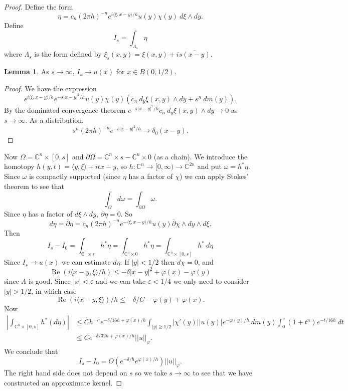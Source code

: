 \documentclass[12pt]{report}
\newcommand{\CC}{\mathbb{C}}
\newcommand{\dbar}{\overline\partial}
\renewcommand{\Re}{\operatorname{Re}}
\theoremstyle{definition}
\newtheorem{lemma}[theorem]{Lemma}
\begin{document}
\begin{proof}
    Define the form
    $$\eta = c_n(2\pi h)^{-n} e^{i\langle \xi, x - y\rangle/h} u(y)\chi(y) ~d\xi \wedge dy.$$
    Define $$I_s = \int_{\Lambda_s} \eta$$
    where $\Lambda_s$ is the form defined by $\xi_s(x, y) = \xi(x, y) + i\overline{s(x - y)}$.
\begin{lemma}
    As $s \to \infty$, $I_s \to u(x)$ for $x \in B(0, 1/2)$.
\end{lemma}
\begin{proof}
    We have the expression
    $$e^{i\langle\xi, x - y\rangle/h} e^{-s|x - y|^2/h} u(y) \chi(y)(c_n ~d_{\overline y} \xi(x, y) \wedge dy + s^n~dm(y)).$$
    By the dominated convergence theorem $e^{-s|x-y|^2/h}c_n~d_{\overline y}\xi(x, y) \wedge dy \to 0$ as $s \to \infty$. As a distribution,
    $$s^n(2\pi h)^{-n} e^{-s|x - y|^2/h} \to \delta_0(x - y).$$
\end{proof}
Now $\Omega = \CC^n \times [0, s]$ and $\partial \Omega = \CC^n \times s - \CC^n \times 0$ (as a chain). We introduce the homotopy $h(y, t) = \langle y, \xi\rangle + it\overline{x - y}$, so $h: \CC^n \to [0, \infty) \to \CC^{2n}$ and put $\omega = h^*\eta$. Since $\omega$ is compactly supported (since $\eta$ has a factor of $\chi$) we can apply Stokes' theorem to see that
    $$\int_\Omega d\omega = \int_{\partial \Omega} \omega.$$
    Since $\eta$ has a factor of $d\xi \wedge dy$, $\partial \eta = 0$. So
    $$d\eta = \dbar \eta = c_n(2\pi h)^{-n} e^{-\langle \xi, x-y\rangle/h} u(y) \dbar \chi \wedge dy \wedge d\xi.$$
    Then
$$
    I_s - I_0 = \int_{\CC^n \times s} h^*\eta = \int_{\CC^n \times 0} h^*\eta = \int_{\CC^n \times [0, s]} h^*~d\eta
$$
    Since $I_s \to u(x)$ we can estimate $d\eta$. If $|y| < 1/2$ then $d\chi = 0$, and
    $$\Re (i\langle x - y, \xi\rangle/h) \leq -\delta|x-y|^2 + \varphi(x) - \varphi(y)$$
    since $\Lambda$ is good. Since $|x| < \varepsilon$ and we can take $\varepsilon < 1/4$ we only need to consider $|y| > 1/2$, in which case
    $$\Re(i\langle x - y, \xi\rangle)/h \leq -\delta/C - \varphi(y) + \varphi(x).$$
    Now
\begin{align*}
    \left|\int_{\CC^n \times [0, s]} h^*(d\eta)\right| &\leq Ch^{-n} e^{-\delta/16h + \varphi(x)/h} \int_{|y| \geq 1/2} |\chi'(y)| |u(y)|e^{-\varphi(y)/h} ~dm(y) \int_0^s (1 + t^n)e^{-t/16h} ~dt\\
    &\leq Ce^{-\delta/32h + \varphi(x)/h}||u||_\varphi.
\end{align*}
    We conclude that
    $$I_s - I_0 = O(e^{-\delta/h}e^{\varphi(x)/h})||u||_\varphi.$$
    The right hand side does not depend on $s$ so we take $s \to \infty$ to see that we have constructed an approximate kernel.
\end{proof}
\end{document}
